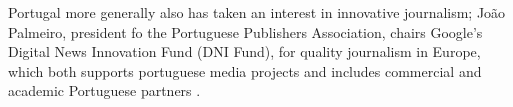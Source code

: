 Portugal more generally also has taken an interest in innovative journalism; João Palmeiro, president fo the Portuguese Publishers Association, chairs Google's Digital News Innovation Fund (DNI Fund), for quality journalism in Europe, which both supports portuguese media projects and includes commercial and academic Portuguese partners \cite{DNIFund2018}. %

